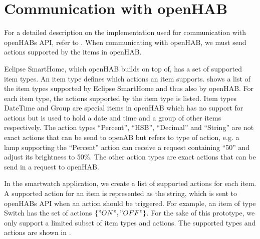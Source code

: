 \section{Communication with openHAB}
\label{sec:design:communication-with-openhab}

For a detailed description on the implementation used for communication with openHABs API, refer to . When communicating with openHAB, we must send actions supported by the items in openHAB.

Eclipse SmartHome, which openHAB builds on top of, has a set of supported item types. An item type defines which actions an item supports.  shows a list of the item types supported by Eclipse SmartHome and thus also by openHAB. For each item type, the actions supported by the item type is listed. Item types DateTime and Group are special items in openHAB which has no support for actions but is used to hold a date and time and a group of other items respectively.
The action types ``Percent'', ``HSB'', ``Decimal'' and ``String'' are not exact actions that can be send to openAB but refers to type of action, e.g. a lamp supporting the ``Percent'' action can receive a request containing ``50'' and adjust its brightness to 50\%. The other action types are exact actions that can be send in a request to openHAB.

In the smartwatch application, we create a list of supported actions for each item. A supported action for an item is represented as the string, which is sent to openHABs API when an action should be triggered. For example, an item of type Switch has the set of actions $\{ "ON", "OFF" \}$. For the sake of this prototype, we only support a limited subset of item types and actions. The supported types and actions are shown in .

